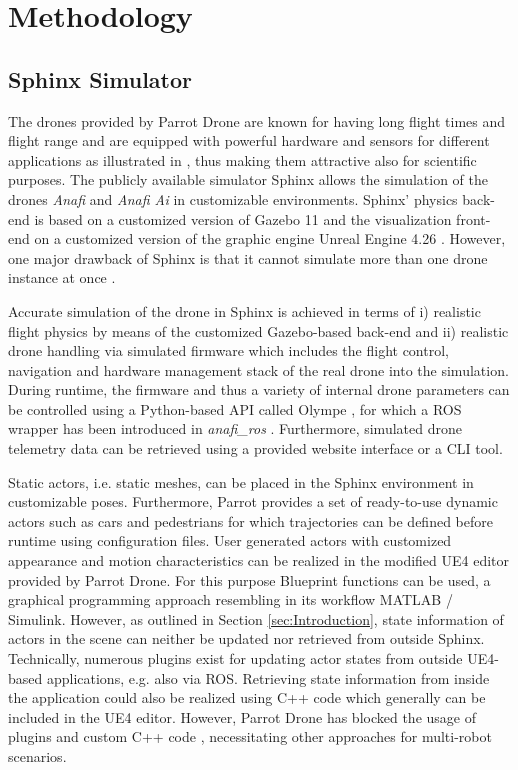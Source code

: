 \section{Methodology}\label{sec:Methodology} \label{sec:methodology}
\subsection{Sphinx Simulator}
 The drones provided by Parrot Drone are known for having long flight times and flight range and are equipped with powerful hardware and sensors for different applications as illustrated in \cite{sarabakha2023}, thus making them attractive also for scientific purposes. The publicly available simulator Sphinx \cite{parrot_sphinx}  allows the simulation of the drones \textit{Anafi} \cite{parrot_anafi} and \textit{Anafi Ai} \cite{parrot_anafi_ai} in customizable environments. Sphinx' physics back-end is based on a customized version of Gazebo 11 and the visualization front-end on a customized version of the graphic engine Unreal Engine 4.26  \cite{parrot_unreal_engine}. However, one major drawback of Sphinx is that it cannot simulate more than one drone instance at once \cite{sphinx_one_drone_only}.

Accurate simulation of the drone in Sphinx is achieved in terms of i) realistic flight physics by means of the customized Gazebo-based back-end and ii) realistic drone handling via simulated firmware which includes the flight control, navigation and hardware management stack of the real drone into the simulation. During runtime, the firmware and thus a variety of internal drone parameters can be controlled using a Python-based API called Olympe \cite{parrot_olympe}, for which a ROS wrapper has been introduced in \textit{anafi_ros} \cite{sarabakha2023}. Furthermore, simulated drone telemetry data can be retrieved using a provided website interface or a CLI tool. 

Static actors, i.e. static meshes, can be placed in the Sphinx environment in customizable poses. Furthermore, Parrot provides a set of ready-to-use dynamic actors such as cars and pedestrians for which trajectories can be defined before runtime  \cite{parrot_sphinx_populate_with_actors} using configuration files. User generated actors with customized appearance and motion characteristics can be realized in the modified UE4 editor provided by Parrot Drone. For this purpose  Blueprint functions can be used, a graphical programming approach resembling in its workflow MATLAB / Simulink. However, as outlined in Section \ref{sec:Introduction}, state information of  actors in the scene can neither be updated nor retrieved from outside Sphinx.
Technically, numerous plugins exist for updating actor states from outside UE4-based applications, e.g. also via ROS. Retrieving state information from inside the application could also be realized using C++ code which generally can be included in the UE4 editor.  However, Parrot Drone has blocked the usage of plugins \cite{parrot_unreal_engine_no_plugins}  and custom C++ code \cite{parrot_unreal_engine_no_cpp}, necessitating other  approaches for multi-robot scenarios.

